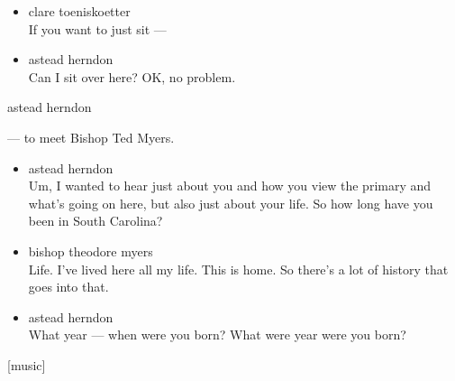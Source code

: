 \begin{itemize}
\item
  clare toeniskoetter\\
  If you want to just sit ---
\item
  astead herndon\\
  Can I sit over here? OK, no problem.
\end{itemize}

astead herndon

--- to meet Bishop Ted Myers.

\begin{itemize}
\item
  astead herndon\\
  Um, I wanted to hear just about you and how you view the primary and
  what's going on here, but also just about your life. So how long have
  you been in South Carolina?
\item
  bishop theodore myers\\
  Life. I've lived here all my life. This is home. So there's a lot of
  history that goes into that.
\item
  astead herndon\\
  What year --- when were you born? What were year were you born?
\end{itemize}

{[}music{]}

